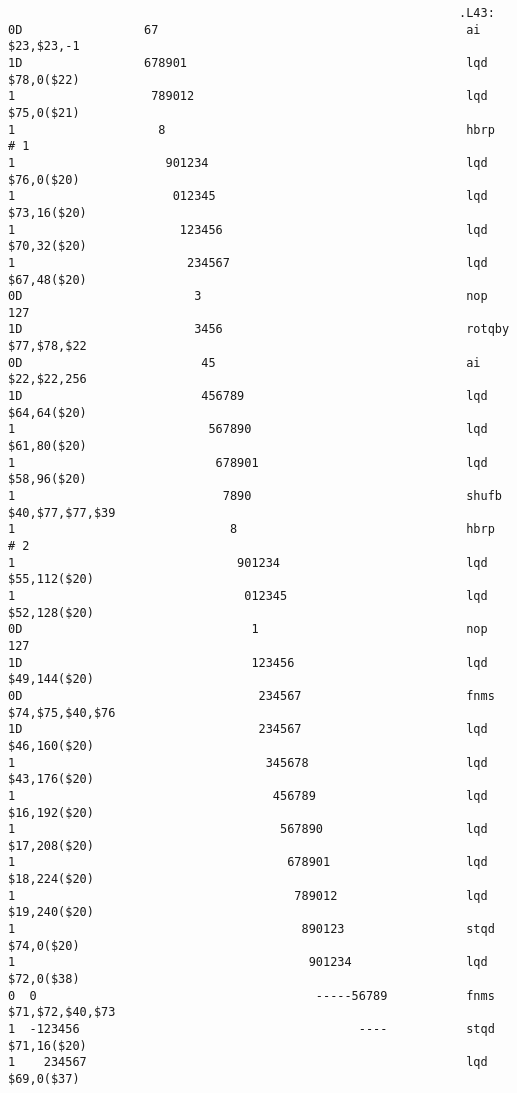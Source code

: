 \begin{verbatim}
                                                               .L43:
0D                 67                                          	ai	$23,$23,-1
1D                 678901                                      	lqd	$78,0($22)
1                   789012                                     	lqd	$75,0($21)
1                    8                                         	hbrp	# 1
1                     901234                                   	lqd	$76,0($20)
1                      012345                                  	lqd	$73,16($20)
1                       123456                                 	lqd	$70,32($20)
1                        234567                                	lqd	$67,48($20)
0D                        3                                    	nop	127
1D                        3456                                 	rotqby	$77,$78,$22
0D                         45                                  	ai	$22,$22,256
1D                         456789                              	lqd	$64,64($20)
1                           567890                             	lqd	$61,80($20)
1                            678901                            	lqd	$58,96($20)
1                             7890                             	shufb	$40,$77,$77,$39
1                              8                               	hbrp	# 2
1                               901234                         	lqd	$55,112($20)
1                                012345                        	lqd	$52,128($20)
0D                                1                            	nop	127
1D                                123456                       	lqd	$49,144($20)
0D                                 234567                      	fnms	$74,$75,$40,$76
1D                                 234567                      	lqd	$46,160($20)
1                                   345678                     	lqd	$43,176($20)
1                                    456789                    	lqd	$16,192($20)
1                                     567890                   	lqd	$17,208($20)
1                                      678901                  	lqd	$18,224($20)
1                                       789012                 	lqd	$19,240($20)
1                                        890123                	stqd	$74,0($20)
1                                         901234               	lqd	$72,0($38)
0  0                                       -----56789          	fnms	$71,$72,$40,$73
1  -123456                                       ----          	stqd	$71,16($20)
1    234567                                                    	lqd	$69,0($37)

\end{verbatim}
